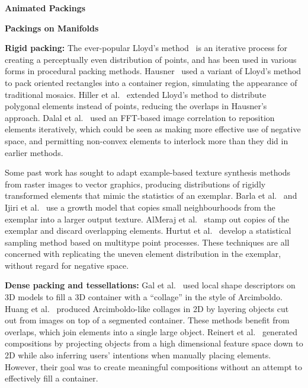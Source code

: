 \textbf{Animated Packings}

\textbf{Packings on Manifolds}


\textbf{Rigid packing:} The ever-popular Lloyd's method~\cite{McCool1992}
is an iterative
process for creating a perceptually even distribution of points, and has been
used in various forms in procedural packing methods.
Hausner~\cite{Hausner2001} 
used a variant of Lloyd's method to pack oriented rectangles into a container 
region, simulating the appearance of traditional mosaics.  
Hiller et al.~\cite{Hiller2003} extended Lloyd's method to distribute polygonal
elements instead of points, reducing the overlaps in Hausner's approach.
Dalal et al.~\cite{Dalal2006} used an FFT-based image correlation to reposition
elements iteratively, which could be seen as making more effective use of negative
space, and permitting non-convex elements to interlock more than they did in
earlier methods.

Some past work has sought to adapt example-based texture synthesis methods
from raster images to vector graphics, producing distributions of rigidly transformed elements
that mimic the statistics of an exemplar.  Barla et al.~\cite{Barla2006} and
Ijiri et al.~\cite{Ijiri2008} use a growth model that copies small neighbourhoods
from the exemplar into a larger output texture.  AlMeraj et al.~\cite{AlMeraj2013}
stamp out copies of the exemplar and discard overlapping elements.
Hurtut et al.~\cite{Hurtut2009} develop a statistical sampling method based
on multitype point processes.  
These techniques are all concerned with replicating
the uneven element distribution in the exemplar, without regard for negative space.

\textbf{Dense packing and tessellations:} 
Gal et al.~\cite{Gal2007B} used local shape descriptors on 3D
models to fill a 3D container with a ``collage'' in the style of
Arcimboldo.  Huang et al.~\cite{Huang2011} produced Arcimboldo-like
collages in 2D by layering objects cut out from images on top of a
segmented container.  These methods benefit from overlaps, which
join elements into a single large object.
Reinert et al.~\cite{Reinert2013} generated compositions by 
projecting objects from a high dimensional feature space down to 2D
while also inferring users' intentions when manually placing elements. However,
their goal was to create meaningful compositions without
an attempt to effectively fill a container.


